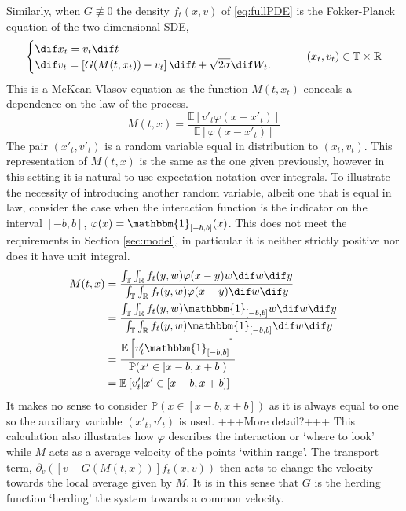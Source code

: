 \documentclass[11pt, a4paper, draft]{article}
\renewcommand{\phi}{\varphi}
\renewcommand{\P}{\mathbb{P}}
\newcommand{\E}{\mathbb{E}}
\renewcommand{\R}{\mathbb{R}}
\newcommand{\T}{\mathbb{T}}
\begin{document}
        Similarly, when $G\not\equiv 0$ the density $f_t(x,v)$ of \eqref{eq:fullPDE} is the Fokker-Planck equation of the two dimensional SDE,
		    \begin{equation}\label{eq:McK_V}\begin{cases}
		    \dif x_t = v_t\dif t\\
		    \dif v_t = \left[G(M(t,x_t))-v_t\right] \dif t + \sqrt{2\sigma} \dif W_t. 
			\end{cases} \qquad  (x_t,v_t) \in \T \times \R
			\end{equation}
		This is a McKean-Vlasov equation as the function $M(t,x_t)$ conceals a dependence on the law of the process. 
        \[
            M(t,x) = \frac{\E\left[ v'_t \phi(x-x'_t)\right]}{\E\left[\phi(x-x'_t)\right]}
        \]
        The pair $(x'_t,v'_t)$ is a random variable equal in distribution to $(x_t,v_t)$. This representation of $M(t,x)$ is the same as the one given previously, however in this setting it is natural to use expectation notation over integrals. To illustrate the necessity of introducing another random variable, albeit one that is equal in law, consider the case when the interaction function is the indicator on the interval $[-b,b]$, $\phi(x) = \mathbbm{1}_{[-b,b]}(x)$. This does not meet the requirements in Section \ref{sec:model}, in particular it is neither strictly positive nor does it have unit integral. 
        \begin{align*}
            M(t,x) &=  \frac{\int_{\T}\int_{\R}f_t(y,w)\phi(x-y)w\dif w \dif y}{\int_{\T}\int_{\R}f_t(y,w)\phi(x-y)\dif w \dif y}\\
            &=  \frac{\int_{\T}\int_{\R}f_t(y,w) \mathbbm{1}_{[-b,b]}w\dif w \dif y}{\int_{\T}\int_{\R}f_t(y,w) \mathbbm{1}_{[-b,b]}\dif w \dif y}\\
            &= \frac{\E\left[ v'_t \mathbbm{1}_{[-b,b]}\right]}{\P(x' \in \left[x-b,x+b\right])}\\
            &= \E\left[ v'_t|x' \in [x-b,x+b] \right]
        \end{align*}
        It makes no sense to consider $\P(x \in [x-b,x+b])$ as it is always equal to one so the auxiliary variable $(x'_t,v'_t)$ is used. +++More detail?+++ This calculation also illustrates how $\phi$ describes the interaction or `where to look' while $M$ acts as a average velocity of the points `within range'. The transport term, $\partial_v\left( \left[ v-G(M(t,x))\right]f_t(x,v)\right)$ then acts to change the velocity towards the local average given by $M$. It is in this sense that $G$ is the herding function `herding' the system towards a common velocity.
        
\end{document}
